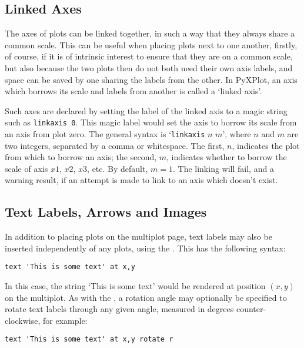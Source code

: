 \subsection{Linked Axes}

The axes of plots can be linked together, in such a way that they always share
a common scale. This can be useful when placing plots next to one another,
firstly, of course, if it is of intrinsic interest to ensure that they are on a
common scale, but also because the two plots then do not both need their own
axis labels, and space can be saved by one sharing the labels from the other.
In PyXPlot, an axis which borrows its scale and labels from another is called a
`linked axis'.

Such axes are declared by setting the label of the linked axis to a magic
string such as {\tt linkaxis 0}\label{linked_axes}. This magic label would set the axis to borrow
its scale from an axis from plot zero. The general syntax is `{\tt linkaxis}
$n$ $m$', where $n$ and $m$ are two integers, separated by a comma or
whitespace. The first, $n$, indicates the plot from which to borrow an axis;
the second, $m$, indicates whether to borrow the scale of axis $x1$, $x2$,
$x3$, etc. By default, $m=1$. The linking will fail, and a warning result, if
an attempt is made to link to an axis which doesn't exist.

\subsection{Text Labels, Arrows and Images}

\label{text_command} In addition to placing plots on the multiplot page, text
labels may also be inserted independently of any plots, using the
. This has the following syntax:

\begin{verbatim} 
text 'This is some text' at x,y
\end{verbatim}

In this case, the string `This is some text' would be rendered at position
$(x,y)$ on the multiplot. As with the , a rotation angle may
optionally be specified to rotate text labels through any given angle, measured
in degrees counter-clockwise, for example:

\begin{verbatim} 
text 'This is some text' at x,y rotate r
\end{verbatim}

